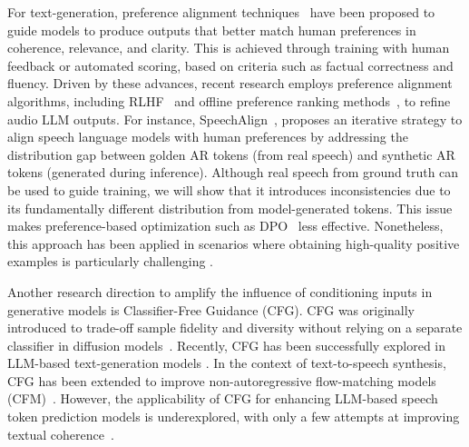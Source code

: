For text-generation, preference alignment techniques~\cite{christiano2017deep,ouyang2022rlhf,shao2024deepseekmath,rafailov2024direct, adler2024nemotron} have been proposed to guide models to produce outputs that better match human preferences in coherence, relevance, and clarity. This is achieved through training with human feedback or automated scoring, based on criteria such as factual correctness and fluency. Driven by these advances, recent research employs preference alignment algorithms, including RLHF~\cite{ouyang2022rlhf} and offline preference ranking methods~\cite{rafailov2024direct,azar2024ipo}, to refine audio LLM outputs. For instance, SpeechAlign~\cite{zhang2024speechalign}, proposes an iterative strategy to align speech language models with human preferences by addressing the distribution gap between golden AR tokens (from real speech) and synthetic AR tokens (generated during inference).  Although real speech from ground truth can be used to guide training, we will show that it introduces inconsistencies due to its fundamentally different distribution from model-generated tokens. This issue makes preference-based optimization such as DPO~\cite{rafailov2024direct} less effective. 
Nonetheless, this approach has been applied in scenarios where obtaining high-quality positive examples is particularly challenging \cite{chen2024self,zhang2024speechalign}. 

Another research direction to amplify the influence of conditioning inputs in generative models is Classifier-Free Guidance (CFG). 
CFG was originally introduced to trade-off sample fidelity and diversity without relying on a separate classifier in diffusion models~\cite{ho2021classifier}.  
Recently, CFG has been successfully explored in LLM-based text-generation models \cite{sanchez2023stay, fonseca2024can, smirnov2024classifier}. In the context of text-to-speech synthesis, CFG has been extended to improve non-autoregressive flow-matching models (CFM)~\cite{le2024voicebox, du2024cosyvoice, chen2024f5, eskimez2024e2}. However, the applicability of CFG for enhancing LLM-based speech token prediction models is underexplored, with only a few attempts at improving textual coherence~\cite{darefsky2024parakeet}.

